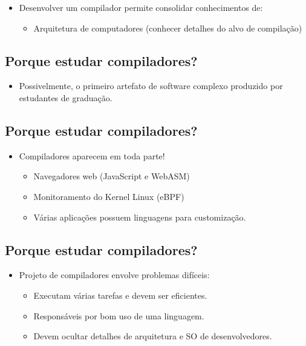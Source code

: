 \documentclass[11pt]{article}
\begin{document}
\begin{itemize}
\item Desenvolver um compilador permite consolidar conhecimentos de:
\begin{itemize}
\item Arquitetura de computadores (conhecer detalhes do alvo de compilação)
\end{itemize}
\end{itemize}
\subsection*{Porque estudar compiladores?}
\label{sec:orgc61e1e9}

\begin{itemize}
\item Possivelmente, o primeiro artefato de software complexo produzido por estudantes de graduação.
\end{itemize}
\subsection*{Porque estudar compiladores?}
\label{sec:orgb0f3f9d}

\begin{itemize}
\item Compiladores aparecem em toda parte!
\begin{itemize}
\item Navegadores web (JavaScript e WebASM)
\item Monitoramento do Kernel Linux (eBPF)
\item Várias aplicações possuem linguagens para customização.
\end{itemize}
\end{itemize}
\subsection*{Porque estudar compiladores?}
\label{sec:org57826d4}

\begin{itemize}
\item Projeto de compiladores envolve problemas difíceis:
\begin{itemize}
\item Executam várias tarefas e devem ser eficientes.
\item Responsáveis por bom uso de uma linguagem.
\item Devem ocultar detalhes de arquitetura e SO de desenvolvedores.
\end{itemize}
\end{itemize}
\end{document}
